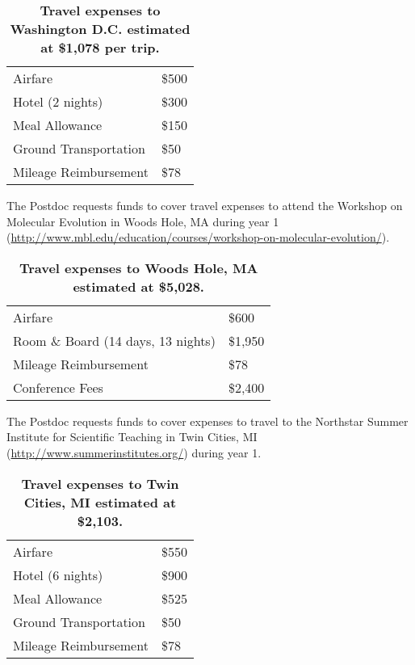 \documentclass[12pt,letterpaper]{article}
\begin{document}

\begin{table}[h!]
\centering
\begin{tabular}{ll}
\hline

	Airfare	& \$500 \\
	Hotel (2 nights) 	& \$300  \\
	Meal Allowance 	& \$150  \\
	Ground Transportation 	  & \$50 \\
	Mileage Reimbursement	& \$78 \\\hline
\end{tabular}
\caption{\textbf{Travel expenses to Washington D.C. estimated at \$1,078 per trip.}}
\end{table}

The Postdoc requests funds to cover travel expenses to attend the Workshop on Molecular Evolution in Woods Hole, MA during year 1\\
(\url{http://www.mbl.edu/education/courses/workshop-on-molecular-evolution/}).




\begin{table}[h!]
\centering
\begin{tabular}{ll}
\hline

	Airfare	& \$600 \\
	Room \& Board (14 days, 13 nights)	& \$1,950 \\
	Mileage Reimbursement	& \$78 \\
	Conference Fees			& \$2,400 \\\hline
\end{tabular}
\caption{\textbf{Travel expenses to Woods Hole, MA estimated at \$5,028.}}
\end{table}

The Postdoc requests funds to cover expenses to travel to the Northstar Summer Institute for Scientific Teaching in Twin Cities, MI (\url{http://www.summerinstitutes.org/}) during year 1.




\begin{table}[h!]
\centering
\begin{tabular}{ll}
\hline
	Airfare	& \$550 \\
	Hotel (6 nights) 	& \$900 \\
	Meal Allowance	& \$525 \\
	Ground Transportation	& \$50 \\
	Mileage Reimbursement	& \$78 \\\hline
\end{tabular}
\caption{\textbf{Travel expenses to Twin Cities, MI estimated at \$2,103.}}
\end{table}
\end{document}
